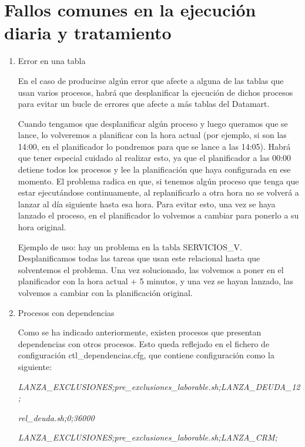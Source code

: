 \documentclass[a4paper, 12pt]{book}
\begin{document}
\section{Fallos comunes en la ejecución diaria y tratamiento} 
\label{sec:fallos}

\begin{enumerate}
	\item Error en una tabla \par
En el caso de producirse algún error que afecte a alguna de las tablas que usan varios procesos, habrá que desplanificar la ejecución de dichos procesos para evitar un bucle de errores que afecte a más tablas del Datamart. 

Cuando tengamos que desplanificar algún proceso y luego queramos que se lance, lo volveremos a planificar con la hora actual (por ejemplo, si son las 14:00, en el planificador lo pondremos para que se lance a las 14:05). Habrá que tener especial cuidado al realizar esto, ya que el planificador a las 00:00 detiene todos los procesos y lee la planificación que haya configurada en ese momento. El problema radica en que, si tenemos algún proceso que tenga que estar ejecutándose continuamente, al replanificarlo a otra hora no se volverá a lanzar al día siguiente hasta esa hora. Para evitar esto, una vez se haya lanzado el proceso, en el planificador lo volvemos a cambiar para ponerlo a su hora original.

Ejemplo de uso: hay un problema en la tabla SERVICIOS\_V. Desplanificamos todas las tareas que usan este relacional hasta que solventemos el problema. Una vez solucionado, las volvemos a poner en el planificador con la hora actual + 5 minutos, y una vez se hayan lanzado, las volvemos a cambiar con la planificación original.

	\item Procesos con dependencias \par
	Como se ha indicado anteriormente, existen procesos que presentan dependencias con otros procesos. Esto queda reflejado en el fichero de configuración ctl\_dependencias.cfg, que contiene configuración como la siguiente:
	
\textit{LANZA\_EXCLUSIONES;pre\_exclusiones\_laborable.sh;LANZA\_DEUDA\_12;}

\begin{flushright}\textit{rel\_deuda.sh;0;36000}
\end{flushright}

\textit{LANZA\_EXCLUSIONES;pre\_exclusiones\_laborable.sh;LANZA\_CRM;}


\end{enumerate}
\end{document}
